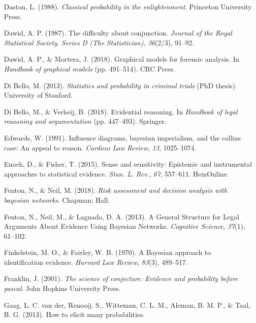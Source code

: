 \documentclass[11pt,dvipsnames,enabledeprecatedfontcommands]{scrartcl}
\begin{document}
\hypertarget{ref-daston1988}{}
Daston, L. (1988). \emph{Classical probability in the enlightenment}.
Princeton University Press.

\hypertarget{ref-dawid1987}{}
Dawid, A. P. (1987). The difficulty about conjunction. \emph{Journal of
the Royal Statistical Society. Series D (The Statistician),}
\emph{36}(2/3), 91--92.

\hypertarget{ref-dawid2018graphical}{}
Dawid, A. P., \& Mortera, J. (2018). Graphical models for forensic
analysis. In \emph{Handbook of graphical models} (pp. 491--514). CRC
Press.

\hypertarget{ref-di2013statistics}{}
Di Bello, M. (2013). \emph{Statistics and probability in criminal
trials} (PhD thesis). University of Stanford.

\hypertarget{ref-di2018evidential}{}
Di Bello, M., \& Verheij, B. (2018). Evidential reasoning. In
\emph{Handbook of legal reasoning and argumentation} (pp. 447--493).
Springer.

\hypertarget{ref-Edwards1991Influence-diagr}{}
Edwards, W. (1991). Influence diagrams, bayesian imperialism, and the
collins case: An appeal to reason. \emph{Cardozo Law Review}, \emph{13},
1025--1074.

\hypertarget{ref-enoch2015sense}{}
Enoch, D., \& Fisher, T. (2015). Sense and sensitivity: Epistemic and
instrumental approaches to statistical evidence. \emph{Stan. L. Rev.},
\emph{67}, 557--611. HeinOnline.

\hypertarget{ref-Fenton2018Risk}{}
Fenton, N., \& Neil, M. (2018). \emph{Risk assessment and decision
analysis with bayesian networks}. Chapman; Hall.

\hypertarget{ref-fenton2013GeneralStructureLegal}{}
Fenton, N., Neil, M., \& Lagnado, D. A. (2013). A General Structure for
Legal Arguments About Evidence Using Bayesian Networks. \emph{Cognitive
Science}, \emph{37}(1), 61--102.

\hypertarget{ref-Finkelstein1970A}{}
Finkelstein, M. O., \& Fairley, W. B. (1970). A Bayesian approach to
identification evidence. \emph{Harvard Law Review}, \emph{83}(3),
489--517.

\hypertarget{ref-Franklin2001}{}
Franklin, J. (2001). \emph{The science of conjecture: Evidence and
probability before pascal}. John Hopkins University Press.

\hypertarget{ref-gaag2013elicit}{}
Gaag, L. C. van der, Renooij, S., Witteman, C. L. M., Aleman, B. M. P.,
\& Taal, B. G. (2013). How to elicit many probabilities.
\end{document}
